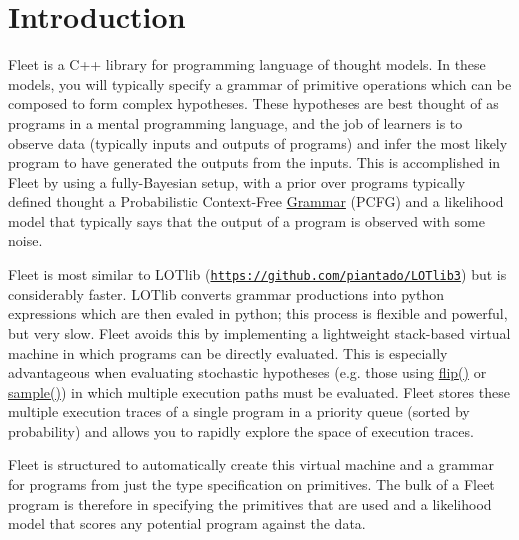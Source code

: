 \hypertarget{index_intro_sec}{}\section{Introduction}\label{index_intro_sec}
Fleet is a C++ library for programming language of thought models. In these models, you will typically specify a grammar of primitive operations which can be composed to form complex hypotheses. These hypotheses are best thought of as programs in a mental programming language, and the job of learners is to observe data (typically inputs and outputs of programs) and infer the most likely program to have generated the outputs from the inputs. This is accomplished in Fleet by using a fully-\/\+Bayesian setup, with a prior over programs typically defined thought a Probabilistic Context-\/\+Free \hyperlink{class_grammar}{Grammar} (P\+C\+FG) and a likelihood model that typically says that the output of a program is observed with some noise.

Fleet is most similar to L\+O\+Tlib (\href{https://github.com/piantado/LOTlib3}{\tt https\+://github.\+com/piantado/\+L\+O\+Tlib3}) but is considerably faster. L\+O\+Tlib converts grammar productions into python expressions which are then evaled in python; this process is flexible and powerful, but very slow. Fleet avoids this by implementing a lightweight stack-\/based virtual machine in which programs can be directly evaluated. This is especially advantageous when evaluating stochastic hypotheses (e.\+g. those using \hyperlink{_random_8h_a40e7e030d95195c87c566b03fdefe44c}{flip()} or \hyperlink{_random_8h_ac2ea1cac6b4c8cad207512d19abe42d7}{sample()}) in which multiple execution paths must be evaluated. Fleet stores these multiple execution traces of a single program in a priority queue (sorted by probability) and allows you to rapidly explore the space of execution traces.

Fleet is structured to automatically create this virtual machine and a grammar for programs from just the type specification on primitives. The bulk of a Fleet program is therefore in specifying the primitives that are used and a likelihood model that scores any potential program against the data.

